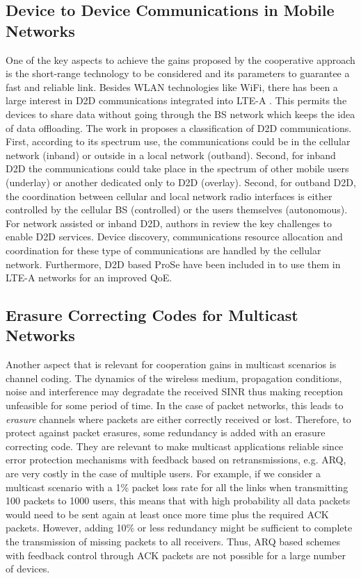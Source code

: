 \subsection{Device to Device Communications in Mobile Networks}
\label{sec:d2d}
One of the key aspects to achieve the gains proposed by the cooperative approach is the short-range technology to be considered and its parameters to guarantee a fast and reliable link. Besides \ac{WLAN} technologies like \ac{WiFi}, there has been a large interest in \ac{D2D} communications integrated into \ac{LTE-A} \cite{lin2013comprehensive,asadi2014survey,feng2014device,tehrani2014device}. This permits the devices to share data without going through the \ac{BS} network which keeps the idea of data offloading. The work in \cite{asadi2014survey} proposes a classification of \ac{D2D} communications. First, according to its spectrum use, the communications could be in the cellular network (inband) or outside in a local network (outband). Second, for inband \ac{D2D} the communications could take place in the spectrum of other mobile users (underlay) or another dedicated only to \ac{D2D} (overlay). Second, for outband \ac{D2D}, the coordination between cellular and local network radio interfaces is either controlled by the cellular \ac{BS} (controlled) or the users themselves (autonomous). For network assisted or inband \ac{D2D}, authors in \cite{fodor2014design} review the key challenges to enable \ac{D2D} services. Device discovery, communications resource allocation and coordination for these type of communications are handled by the cellular network. Furthermore, \ac{D2D} based \ac{ProSe} have been included in \cite{3gpp2012prose} to use them in \ac{LTE-A} networks for an improved \ac{QoE}.

\subsection{Erasure Correcting Codes for Multicast Networks}
\label{sec:erasure_codes}
Another aspect that is relevant for cooperation gains in multicast scenarios is channel coding. The dynamics of the wireless medium, propagation conditions, noise and interference may degradate the received \ac{SINR} thus making reception unfeasible for some period of time. In the case of packet networks, this leads to \textit{erasure} channels where packets are either correctly received or lost. Therefore, to protect against packet erasures, some redundancy is added with an erasure correcting code. They are relevant to make multicast applications reliable since error protection mechanisms with feedback based on retransmissions, e.g. \ac{ARQ}, are very costly in the case of multiple users. For example, if we consider a multicast scenario with a 1\% packet loss rate for all the links when transmitting 100 packets to 1000 users, this means that with high probability all data packets would need to be sent again at least once more time plus the required \ac{ACK} packets. However, adding 10\% or less redundancy might be sufficient to complete the transmission of missing packets to all receivers. Thus, \ac{ARQ} based schemes with feedback control through \ac{ACK} packets are not possible for a large number of devices.

